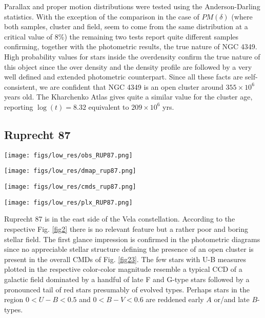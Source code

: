 \documentclass{aa}
\begin{document}
Parallax and proper motion distributions were tested using the Anderson-Darling
statistics. With the exception of the comparison in the case of $PM(\delta)$
(where both samples, cluster and field, seem to come from the same distribution
at a critical value of 8\%) the remaining two tests report quite different
samples confirming, together with the photometric results, the true nature of
NGC 4349.\\

High probability values for stars inside the overdensity confirm the
true nature of this object since the over density and the density profile
are followed by a very well defined and extended photometric counterpart.
Since all these facts are self-consistent, we are confident that NGC 4349 is
an open cluster around $355\times10^6$ years old.
The Kharchenko Atlas gives quite a similar value for the cluster age, reporting
$\log(t)=8.32$ equivalent to $209\times10^6$ yrs.



\subsection{Ruprecht 87}

\begin{figure*}[ht]
    \centering
    \texttt{[image: figs/low\_res/obs\_RUP87.png]}
    \caption{Idem Fig. \ref{fig3} for Ruprecht 87.}
    \label{fig23}
\end{figure*}
\begin{figure*}[ht]
    \centering
    \texttt{[image: figs/low\_res/dmap\_rup87.png]}
    \caption{Idem Fig. \ref{fig4} for Ruprecht 87.}
    \label{fig24}
\end{figure*}
\begin{figure*}[ht]
    \centering
    \texttt{[image: figs/low\_res/cmds\_rup87.png]}
    \caption{Idem Fig. \ref{fig5} for Ruprecht 87.}
    \label{fig25}
\end{figure*}
\begin{figure*}[ht]
    \centering
    \texttt{[image: figs/low\_res/plx\_RUP87.png]}
    \caption{Idem Fig. \ref{fig6} for Ruprecht 87.}
    \label{fig26}
\end{figure*}

Ruprecht 87 is in the east side of the Vela
constellation. According to the respective Fig. \ref{fig2} there is no relevant
feature but a rather poor and boring stellar field. The first glance impression
is confirmed in the photometric diagrams since no appreciable stellar structure
defining the presence of an open cluster is present in the overall CMDs of Fig.
\ref{fig23}. The few stars with U-B measures plotted in the respective
color-color magnitude resemble a typical CCD of a galactic field dominated by a
handful of late F and G-type stars followed by a pronounced tail of red stars
presumably of evolved types. Perhaps stars in the region $0 < U-B < 0.5$ and $0
< B-V < 0.6$ are reddened early $A$ or/and late $B$-types.\\
\end{document}
